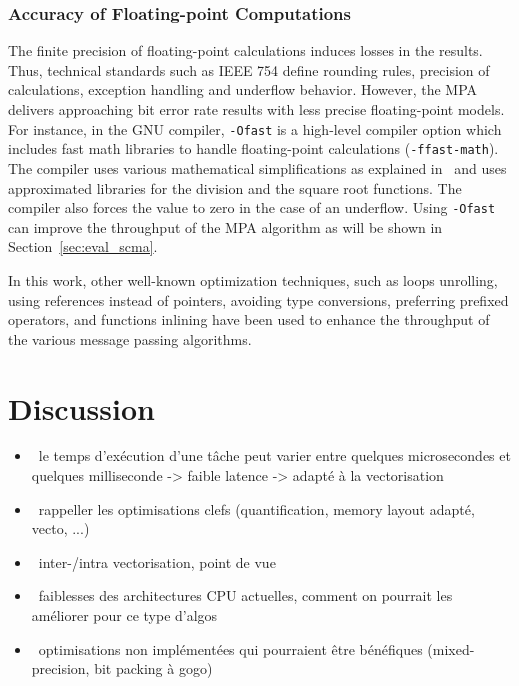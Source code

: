 \subsubsection{Accuracy of Floating-point Computations}
\label{sec:opt_scma_float}

The finite precision of floating-point calculations induces losses in the
results. Thus, technical standards such as IEEE 754 define rounding rules,
precision of calculations, exception handling and underflow behavior. However,
the MPA delivers approaching bit error rate results with less precise
floating-point models. For instance, in the GNU compiler, \verb|-Ofast| is a
high-level compiler option which includes fast math libraries to handle
floating-point calculations (\verb|-ffast-math|). The compiler uses various
mathematical simplifications as explained in~\cite{Gccfp2018} and uses
approximated libraries for the division and the square root functions. The
compiler also forces the value to zero in the case of an underflow. Using
\verb|-Ofast| can improve the throughput of the MPA algorithm as will be shown
in Section~\ref{sec:eval_scma}.

In this work, other well-known optimization techniques, such as loops unrolling,
using references instead of pointers, avoiding type conversions, preferring
prefixed operators, and functions inlining have been used to enhance the
throughput of the various message passing algorithms.

\section{Discussion}

\begin{itemize}
  \item \xmark~le temps d’exécution d’une tâche peut varier entre quelques
    microsecondes et quelques milliseconde -> faible latence -> adapté à la
    vectorisation
  \item \xmark~rappeller les optimisations clefs (quantification, memory layout
    adapté, vecto, ...)
  \item \xmark~inter-/intra vectorisation, point de vue
  \item \xmark~faiblesses des architectures CPU actuelles, comment on pourrait
    les améliorer pour ce type d'algos
  \item \xmark~optimisations non implémentées qui pourraient être bénéfiques
    (mixed-precision, bit packing à gogo)
\end{itemize}